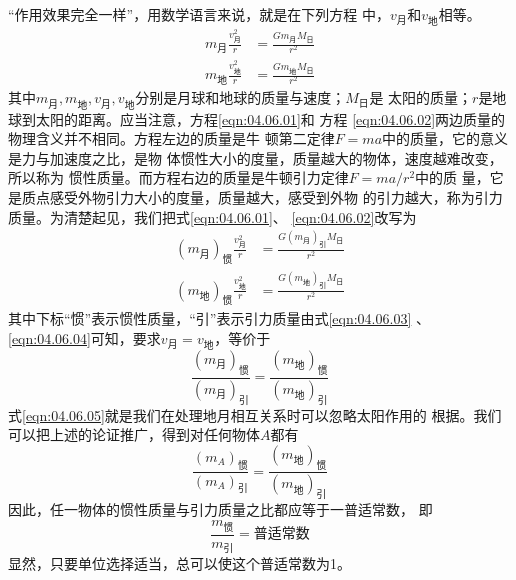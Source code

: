 “作用效果完全一样”，用数学语言来说，就是在下列方程
中，$ v_\text{月} $和$v_\text{地}$相等。
\begin{align}
  m _ { \text{月} } \frac { v _ { \text{月} } ^ { 2 } } { r } &= \frac { G m _ { \text{月} } M _ { \text{日} } } { r ^ { 2 } } \label{eqn:04.06.01} \\
  m _ { \text{地} } \frac { v _ { \text{地} } ^ { 2 } } { r } &= \frac { G m _ { \text{地} } M _ { \text{日} } } { r ^ { 2 } } \label{eqn:04.06.02}
\end{align}
其中$ m _ { \text{月} } , m _ { \text{地} } , v _ { \text{月} } , v _ { \text{地} } $分别是月球和地球的质量与速度；$ M _ { \text{日} } $是
太阳的质量；$ r $是地球到太阳的距离。应当注意，方程\eqref{eqn:04.06.01}和
方程 \eqref{eqn:04.06.02}两边质量的物理含义并不相同。方程左边的质量是牛
顿第二定律$  F = m a   $中的质量，它的意义是力与加速度之比，是物
体惯性大小的度量，质量越大的物体，速度越难改变，所以称为
惯性质量。而方程右边的质量是牛顿引力定律$  F = m a / r ^ { 2 }   $中的质
量，它是质点感受外物引力大小的度量，质量越大，感受到外物
的引力越大，称为引力质量。为清楚起见，我们把式\eqref{eqn:04.06.01}、
\eqref{eqn:04.06.02}改写为
\begin{align}
  \left(m _ { \text{月} }\right) _ {\text{惯}}
  \frac { v _ { \text{月} } ^ 2 } { r } &= \frac { G \left(m _ { \text{月} }\right) _ {\text{引}} M _ { \text{日} } } { r ^ { 2 } }\label{eqn:04.06.03} \\
  \left(m _ { \text{地} }\right) _ {\text{惯}}
  \frac { v _ { \text{地} } ^ 2 } { r } &= \frac { G \left(m _ { \text{地} }\right) _ {\text{引}} M _ { \text{日} } } { r ^ { 2 } }\label{eqn:04.06.04}
\end{align}
其中下标“惯”表示惯性质量，“引”表示引力质量由式\eqref{eqn:04.06.03}
、\eqref{eqn:04.06.04}可知，要求$ v _ { \text{月}}=v _ { \text{地} } $，等价于
\begin{equation}\label{eqn:04.06.05}
  \frac { \left(m _ { \text{月} }\right) _ {\text{惯}} } { \left(m _ { \text{月} }\right) _ {\text{引}} } = \frac { \left(m _ { \text{地} }\right) _ {\text{惯}} } { \left(m _ { \text{地} }\right) _ {\text{引}} }
\end{equation}
式\eqref{eqn:04.06.05}就是我们在处理地月相互关系时可以忽略太阳作用的
根据。我们可以把上述的论证推广，得到对任何物体$ A $都有
\begin{equation}\label{eqn:04.06.06}
  \frac { \left(m _ { A }\right) _ {\text{惯}} } { \left(m _ { A }\right) _ {\text{引}} } = \frac { \left(m _ { \text{地} }\right) _ {\text{惯}} } { \left(m _ { \text{地} }\right) _ {\text{引}} }
\end{equation}
因此，任一物体的惯性质量与引力质量之比都应等于一普适常数，
即
\begin{equation}\label{eqn:04.06.07}
  \frac { m _ {\text{惯}} } { m _ {\text{引}} } = \text{普适常数}
\end{equation}
显然，只要单位选择适当，总可以使这个普适常数为1。

